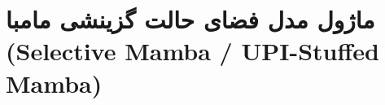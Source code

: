 \section{ماژول مدل فضای حالت گزینشی مامبا (Selective Mamba / UPI-Stuffed Mamba)}
\label{sec:module_upi_stuffed_mamba}
